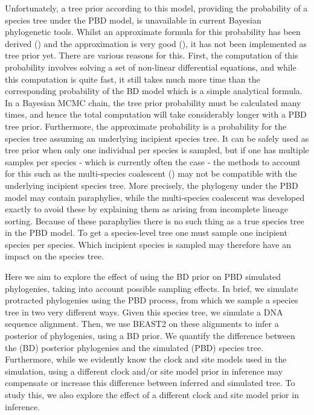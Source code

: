 \documentclass{article}
\begin{document}
Unfortunately, a tree prior according to this model, 
providing the probability of a species tree under the PBD model, 
is unavailable in current Bayesian phylogenetic tools. 
Whilst an approximate formula for this probability has been derived (\cite{lambert_et_al_2015}) 
and the approximation is very good (\cite{simonet_et_al_2018}), 
it has not been implemented as tree prior yet. 
There are various reasons for this. 
First, the computation of this probability involves solving a set of 
non-linear differential equations, and while this computation is quite fast, 
it still takes much more time than the corresponding probability 
of the BD model which is a simple analytical formula. 
In a Bayesian MCMC chain, the tree prior probability must be calculated many times, 
and hence the total computation will take considerably longer with a PBD tree prior. 
Furthermore, the approximate probability is a probability for the species tree 
assuming an underlying incipient species tree. 
It can be safely used as tree prior when only one individual per species is sampled, 
but if one has multiple samples per species - which is currently often the case - the methods 
to account for this such as the multi-species coalescent (\cite{heled_and_drummond_2009}) 
may not be compatible with the underlying incipient species tree. 
More precisely, the phylogeny under the PBD model may contain paraphylies, 
while the multi-species coalescent was developed exactly to avoid 
these by explaining them as arising from incomplete lineage sorting. 
Because of these paraphylies there is no such thing as a true species tree in the PBD model. 
To get a species-level tree one must sample one incipient species per species. 
Which incipient species is sampled may therefore have an impact on the species tree.

Here we aim to explore the effect of using the
BD prior on PBD simulated phylogenies, taking into account possible sampling effects.
In brief, we simulate protracted phylogenies using the PBD process,
from which we sample a species tree in two very different ways. Given this species tree, 
we simulate a DNA sequence alignment. Then, we use BEAST2 on these alignments
to infer a posterior of phylogenies, using a BD prior. We quantify the difference
between the (BD) posterior phylogenies and the simulated (PBD) species tree.
Furthermore, while we evidently know the clock and site models used in the simulation, 
using a different clock and/or site model prior in inference 
may compensate or increase this difference between inferred and simulated tree. 
To study this, we also explore the effect of 
a different clock and site model prior in inference.
\end{document}
